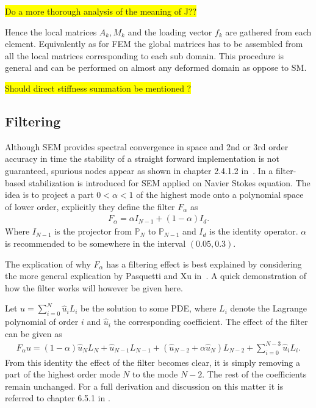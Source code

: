 \colorbox{yellow}{Do a more thorough analysis of the meaning of J??}

Hence the local matrices $A_k,M_k$ and the loading vector $f_k$ 
are gathered from each element.
Equivalently as for FEM the global matrices has to be assembled
from all the local matrices corresponding to each sub domain. This procedure is general and can 
be performed on almost any deformed domain as oppose to SM. 

\colorbox{yellow}{Should direct stiffness summation be mentioned ?}


\subsection{Filtering}
Although SEM provides spectral convergence in space and 2nd or 3rd order accuracy in time the stability of a straight forward
implementation is not guaranteed, spurious nodes appear 
as shown in chapter 2.4.1.2 in~\cite{Karniadakis}.
In \cite{FischerMullen} a filter-based stabilization is introduced for SEM applied on 
Navier Stokes equation. The idea is to project a part $ 0 <\alpha < 1$ 
of the highest mode onto a polynomial space of lower order, 
explicitly they define the filter $F_{\alpha}$ as 
%
\begin{align}
    F_{\alpha}= \alpha I_{N-1}  + (1-\alpha) I_d.
    \label{eq:filter}
\end{align}
%
Where $I_{N-1}$ is the projector from $\mathbb{P}_N$ to $\mathbb{P}_{N-1}$ and $ I_d$ is the identity operator.
$\alpha$ is recommended to be somewhere in the interval $(0.05,0.3)$.

The explication of why $F_{\alpha}$ has a filtering effect is best explained by considering the 
more general explication by Pasquetti and Xu in~\cite{Pasquetti}. A quick demonstration of 
how the filter works will however be given here. 

Let $u = \sum_{i=0}^{N} \hat{u}_i L_i$ be the solution to some PDE, where $L_i$ denote the Lagrange
polynomial of order $i$ and $\hat{u}_i$ the corresponding coefficient. The effect of the filter
can be given as 
%
\begin{align}
    F_{\alpha} u = 
    (1-\alpha)\hat{u}_{N}L_{N}
    +\hat{u}_{N-1}L_{N-1} +
    (\hat{u}_{N-2}+\alpha \hat{u}_{N})L_{N-2}
    +\sum_{i=0}^{N-3}\hat{u}_{i}L_{i}.
    \label{eq:filtereffect}
\end{align}
%
From this identity the effect of the filter becomes clear, it is simply removing a part of 
the highest order mode $N$ to the mode $N-2$. The rest of the coefficients remain unchanged.
For a full derivation and discussion on this matter it is referred to chapter 6.5.1 in 
\cite{Karniadakis}.

